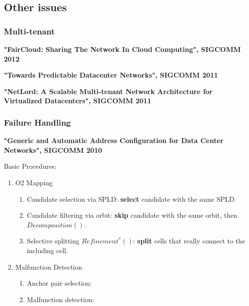 \documentclass[journal,onecolumn,11pt]{IEEEtran}
\begin{document}

\subsection{Other issues}

\subsubsection{Multi-tenant}

\textbf{"FairCloud: Sharing The Network In Cloud Computing", SIGCOMM 2012}

\textbf{"Towards Predictable Datacenter Networks", SIGCOMM 2011}

\textbf{"NetLord: A Scalable Multi-tenant Network Architecture for Virtualized Datacenters", SIGCOMM 2011}

\subsubsection{Failure Handling}

\textbf{"Generic and Automatic Address Configuration for Data Center Networks", SIGCOMM 2010}

Basic Procedures:
\begin{enumerate}
  \item O2 Mapping
  \begin{enumerate}
    \item Candidate selection via SPLD: \textbf{select} candidate with the same SPLD.
    \item Candidate filtering via orbit: \textbf{skip} candidate with the same orbit, then $Decomposition()$.
    \item Selective splitting $Refinement^*()$: \textbf{split} cells that really connect to the including cell.
  \end{enumerate}
  \item Malfunction Detection
  \begin{enumerate}
    \item Anchor pair selection:
    \item Malfunction detection:
  \end{enumerate}
\end{enumerate}
\end{document}
